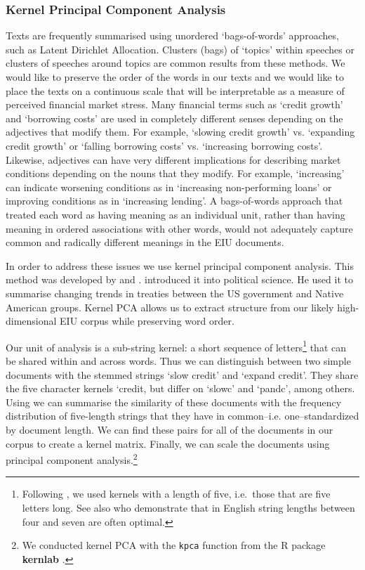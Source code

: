 \documentclass[]{article}
\begin{document}
\subsubsection{Kernel Principal Component
Analysis}\label{kernel-principal-component-analysis}

Texts are frequently summarised using unordered `bags-of-words'
approaches, such as Latent Dirichlet Allocation. Clusters (bags) of `topics' within speeches or clusters of speeches around topics \citep[for a review see][]{Grimmer2013} are common results from these methods. We would like to preserve the order of the words in our texts and we would like to place the texts on a continuous scale that will be interpretable as a measure of perceived financial market stress. Many financial terms such as `credit growth' and `borrowing costs' are used in completely different senses depending on the adjectives that modify them. For example, `slowing credit growth' vs. `expanding credit growth' or `falling borrowing costs' vs. `increasing borrowing costs'. Likewise, adjectives can have very different implications for describing market conditions depending on the nouns that they modify. For example, `increasing' can indicate worsening conditions as in `increasing non-performing loans' or improving conditions as in `increasing lending'.  A
bags-of-words approach that treated each word as having meaning as an individual unit, rather than having meaning in ordered associations with other words, would not adequately capture common and radically different meanings in the EIU documents.

In order to address these issues we use kernel principal component analysis. This method was developed by \cite{Scholkopf1998} and \cite{lodhi2002}. \cite{Spirling2012} introduced it into political science. He used it to summarise changing trends in treaties between the US government and Native American groups. Kernel PCA allows us to extract structure from our likely high-dimensional EIU corpus \cite[6531--6537]{Zhang2010} while preserving word order.

Our unit of analysis is a sub-string kernel: a short sequence of letters\footnote{Following \cite{Spirling2012}, we used kernels with a length of five, i.e.~those that are five letters long. See also \cite{lodhi2002} who demonstrate that in English  string lengths between four and seven are often optimal.} that can be shared within and across words. Thus we can distinguish between two simple documents with the stemmed strings `slow credit' and `expand credit'. They share the five character kernels `credit, but differ on `slowc' and `pandc', among others. Using \cite{lodhi2002} we can summarise the similarity of these documents with the frequency distribution of five-length strings that they have in common--i.e. one--standardized by document length. We can find these pairs
for all of the documents in our corpus to create a kernel matrix. Finally, we can scale the documents using principal component analysis.\footnote{We conducted kernel PCA with the \texttt{kpca} function from the R package \textbf{kernlab} \citep{kerblabCite}.}
\end{document}
